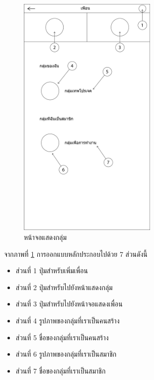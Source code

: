 		\begin{figure}[H]
			\centering
			\includegraphics[width=0.6\textwidth]{Figures/3/UI/group}
			\caption{หน้าจอแสดงกลุ่ม}
			\label{Fig:กลุ่ม}
		\end{figure}
		จากภาพที่ \ref{Fig:กลุ่ม} การออกแบบหลักประกอบไปด้วย 7 ส่วนดังนี้
		\begin{itemize}
			\item ส่วนที่ 1 ปุ่มสำหรับเพิ่มเพื่อน
			\item ส่วนที่ 2 ปุ่มสำหรับไปยังหน้าแสดงกลุ่ม
			\item ส่วนที่ 3 ปุ่มสำหรับไปยังหน้าจอแสดงเพื่อน
			\item ส่วนที่ 4 รูปภาพของกลุ่มที่เราเป็นคนสร้าง
			\item ส่วนที่ 5 ชื่อของกลุ่มที่เราเป็นคนสร้าง
			\item ส่วนที่ 6 รูปภาพของกลุ่มที่เราเป็นสมาชิก
			\item ส่วนที่ 7 ชื่อของกลุ่มที่เราเป็นสมาชิก
		\end{itemize}

